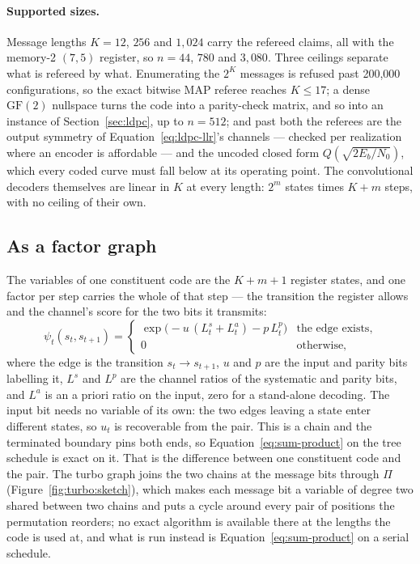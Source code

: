\documentclass[11pt,a4paper]{article}
\begin{document}
\paragraph{Supported sizes.}
\label{par:turbo:sizes}
Message lengths $K = 12$, $256$ and $1{,}024$ carry the refereed claims, all
with the memory-2 $(7,5)$ register, so $n = 44$, $780$ and $3{,}080$. Three
ceilings separate what is refereed by what. Enumerating the $2^K$ messages
is refused past 200,000 configurations, so the exact bitwise MAP referee
reaches $K \le 17$; a dense $\mathrm{GF}(2)$ nullspace turns the code into a
parity-check matrix, and so into an instance of Section~\ref{sec:ldpc}, up
to $n = 512$; and past both the referees are the output symmetry of
Equation~\ref{eq:ldpc-llr}'s channels --- checked per realization where an
encoder is affordable --- and the uncoded closed form
$Q(\sqrt{2 E_b/N_0})$, which every coded curve must fall below at its
operating point. The convolutional decoders themselves are linear in $K$ at
every length: $2^m$ states times $K + m$ steps, with no ceiling of their
own.

\subsection{As a factor graph}
The variables of one constituent code are the $K + m + 1$ register states,
and one factor per step carries the whole of that step --- the transition
the register allows and the channel's score for the two bits it transmits:
\begin{equation}
  \psi_t(s_{t}, s_{t+1}) =
  \begin{cases}
    \exp\!\big(-u\,(L^{s}_t + L^{a}_t) - p\,L^{p}_t\big)
      & \text{the edge exists,} \\
    0 & \text{otherwise,}
  \end{cases}
  \label{eq:turbo-factor}
\end{equation}
where the edge is the transition $s_t \to s_{t+1}$, $u$ and $p$ are the input
and parity bits labelling it, $L^{s}$ and $L^{p}$ are the channel ratios of
the systematic and parity bits, and $L^{a}$ is an a priori ratio on the
input, zero for a stand-alone decoding. The input bit needs no variable of its own: the two edges leaving
a state enter different states, so $u_t$ is recoverable from the pair. This
is a chain and the terminated boundary pins both ends, so
Equation~\ref{eq:sum-product} on the tree schedule is exact on it. That is
the difference between one constituent code and the pair. The turbo graph
joins the two chains at the message bits through $\Pi$
(Figure~\ref{fig:turbo:sketch}), which makes each message bit a variable of
degree two shared between two chains and puts a cycle around every pair of
positions the permutation reorders; no exact algorithm is available there at
the lengths the code is used at, and what is run instead is
Equation~\ref{eq:sum-product} on a serial schedule.
\end{document}
